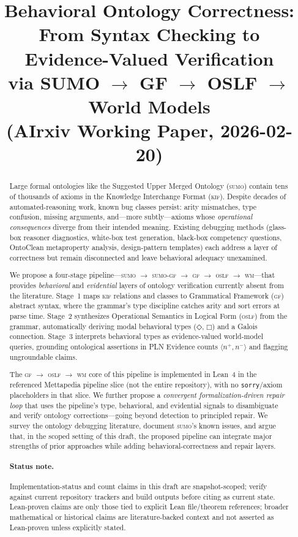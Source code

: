 \documentclass[11pt]{article}
\title{Behavioral Ontology Correctness:\\
From Syntax Checking to Evidence-Valued Verification\\
via SUMO $\to$ GF $\to$ OSLF $\to$ World Models\\[6pt]
\large (AIrxiv Working Paper, 2026-02-20)}
\author{}
\date{}
\newcommand{\DiamondOp}{\mathbin{\Diamond}}
\newcommand{\BoxOp}{\mathbin{\Box}}
\newcommand{\KIF}{\textsc{kif}}
\newcommand{\SUMO}{\textsc{sumo}}
\newcommand{\GF}{\textsc{gf}}
\newcommand{\OSLF}{\textsc{oslf}}
\newcommand{\WM}{\textsc{wm}}
\newcommand{\ev}[2]{\langle #1, #2 \rangle}
\theoremstyle{definition}
\theoremstyle{plain}
\begin{document}
\maketitle

\begin{abstract}
Large formal ontologies like the Suggested Upper Merged Ontology (\SUMO{}) contain
tens of thousands of axioms in the Knowledge Interchange Format (\KIF{}).
Despite decades of automated-reasoning work, known bug classes persist: arity mismatches,
type confusion, missing arguments, and---more subtly---axioms whose
\emph{operational consequences} diverge from their intended meaning.
Existing debugging methods (glass-box reasoner diagnostics, white-box test
generation, black-box competency questions, OntoClean metaproperty analysis,
design-pattern templates) each address a layer of correctness but remain
disconnected and leave behavioral adequacy unexamined.

We propose a four-stage pipeline---\SUMO{} $\to$ \SUMO{}-\GF{} $\to$ \GF{}
$\to$ \OSLF{} $\to$ \WM{}---that provides \emph{behavioral} and
\emph{evidential} layers of ontology verification currently absent from the
literature.
Stage~1 maps \KIF{} relations and classes to Grammatical Framework (\GF{})
abstract syntax, where the grammar's type discipline catches arity and sort
errors at parse time.
Stage~2 synthesizes Operational Semantics in Logical Form (\OSLF{}) from the
grammar, automatically deriving modal behavioral types ($\DiamondOp$, $\BoxOp$)
and a Galois connection.
Stage~3 interprets behavioral types as evidence-valued world-model queries,
grounding ontological assertions in PLN Evidence counts $\ev{n^+}{n^-}$ and
flagging ungroundable claims.

The \GF{} $\to$ \OSLF{} $\to$ \WM{} core of this pipeline is implemented in
Lean~4 in the referenced Mettapedia pipeline slice (not the entire repository),
with no \texttt{sorry}/axiom placeholders in that slice.
We further propose a \emph{convergent formalization-driven repair loop} that
uses the pipeline's type, behavioral, and evidential signals to disambiguate
and verify ontology corrections---going beyond detection to principled repair.
We survey the ontology debugging literature, document \SUMO{}'s known issues,
and argue that, in the scoped setting of this draft, the proposed pipeline can
integrate major strengths of prior approaches while adding behavioral-correctness
and repair layers.
\paragraph{Status note.} Implementation-status and count claims in this draft are snapshot-scoped; verify against current repository trackers and build outputs before citing as current state. Lean-proven claims are only those tied to explicit Lean file/theorem references; broader mathematical or historical claims are literature-backed context and not asserted as Lean-proven unless explicitly stated.
\end{abstract}
\end{document}
